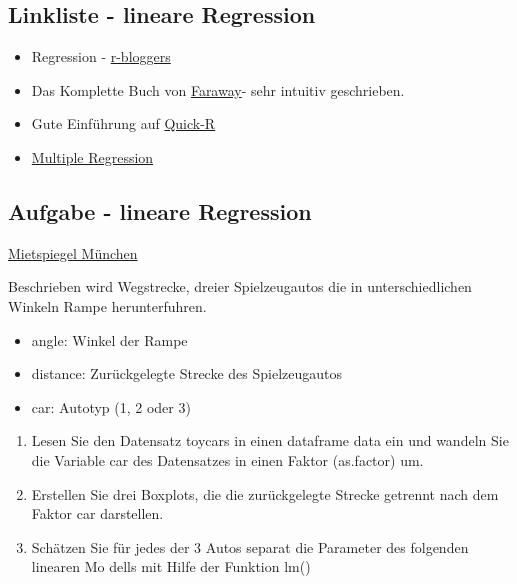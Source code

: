 \documentclass[]{article}
\providecommand{\tightlist}{%
  \setlength{\itemsep}{0pt}\setlength{\parskip}{0pt}}
\begin{document}
\subsection{Linkliste - lineare
Regression}\label{linkliste---lineare-regression}

\begin{itemize}
\item
  Regression -
  \href{http://www.r-bloggers.com/r-tutorial-series-simple-linear-regression/}{r-bloggers}
\item
  Das Komplette Buch von
  \href{http://cran.r-project.org/doc/contrib/Faraway-PRA.pdf}{Faraway}-
  sehr intuitiv geschrieben.
\item
  Gute Einführung auf
  \href{http://www.statmethods.net/stats/regression.html}{Quick-R}
\item
  \href{https://www.r-bloggers.com/multiple-regression-part-1/}{Multiple
  Regression}
\end{itemize}

\subsection{Aufgabe - lineare
Regression}\label{aufgabe---lineare-regression}

\href{http://data.ub.uni-muenchen.de/2/}{Mietspiegel München}

Beschrieben wird Wegstrecke, dreier Spielzeugautos die in
unterschiedlichen Winkeln Rampe herunterfuhren.

\begin{itemize}
\tightlist
\item
  angle: Winkel der Rampe
\item
  distance: Zurückgelegte Strecke des Spielzeugautos
\item
  car: Autotyp (1, 2 oder 3)
\end{itemize}

\begin{enumerate}
\def\labelenumi{(\alph{enumi})}
\item
  Lesen Sie den Datensatz toycars in einen dataframe data ein und
  wandeln Sie die Variable car des Datensatzes in einen Faktor
  (as.factor) um.
\item
  Erstellen Sie drei Boxplots, die die zurückgelegte Strecke getrennt
  nach dem Faktor car darstellen.
\item
  Schätzen Sie für jedes der 3 Autos separat die Parameter des folgenden
  linearen Mo dells mit Hilfe der Funktion lm()
\end{enumerate}
\end{document}
